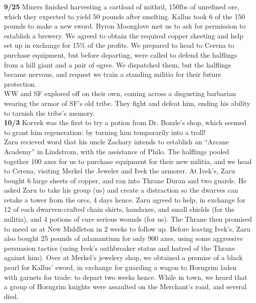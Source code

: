 \documentclass[letterpaper]{article}
\begin{document}
\noindent \textbf{9/25} Miners finished harvesting a cartload of mithril, 150lbs of unrefined ore, which they expected to yield 50 pounds after smelting. Kallus took 6 of the 150 pounds to make a new sword.  Byron Moonglove met us to ask for permission to establish a brewery.  We agreed to obtain the required copper sheeting and help set up in exchange for 15\% of the profits. We prepared to head to Cerena to purchase equipment, but before departing, were called to defend the halflings from a hill giant and a pair of ogres.  We dispatched them, but the halflings became nervous, and request we train a standing militia for their future protection. \\

\noindent WW and SF explored off on their own, coming across a disgusting barbarian wearing the armor of SF's old tribe.  They fight and defeat him, ending his ability to tarnish the tribe's memory. \\

\noindent \textbf{10/3} Korvek was the first to try a potion from Dr. Bozzle's shop, which seemed to grant him regeneration: by turning him temporarily into a troll! \\

\noindent Zaru recieved word that his uncle Zachary intends to establish an ``Arcane Academy'' in Lindstrom, with the assistance of Philo.  The halflings pooled together 100 axes for us to purchase equipment for their new militia, and we head to Cerena, visiting Merkel the Jeweler and Ivek the armorer.  At Ivek's, Zaru bought 6 large sheets of copper, and ran into Thrane Duran and two guards.  He asked Zaru to take his group (us) and create a distraction so the dwarves can retake a tower from the orcs, 4 days hence. Zaru agreed to help, in exchange for 12 of each dwarven-crafted chain shirts, handaxes, and small shields (for the militia), and 4 potions of cure serious wounds (for us).  The Thrane then promised to meed us at New Middleton in 2 weeks to follow up.  Before leaving Ivek's, Zaru also bought 25 pounds of adamantium for only 900 axes, using some aggressive persuasion tactics (using Ivek's oathbreaker status and hatred of the Thrane against him).  Over at Merkel's jewelery shop, we obtained a promise of a black pearl for Kallus' sword, in exchange for guarding a wagon to Horngrim laden with garnets for trade: to depart two weeks hence. While in town, we heard that a group of Horngrim knights were assaulted on the Merchant's road, and several died. \\
\end{document}
